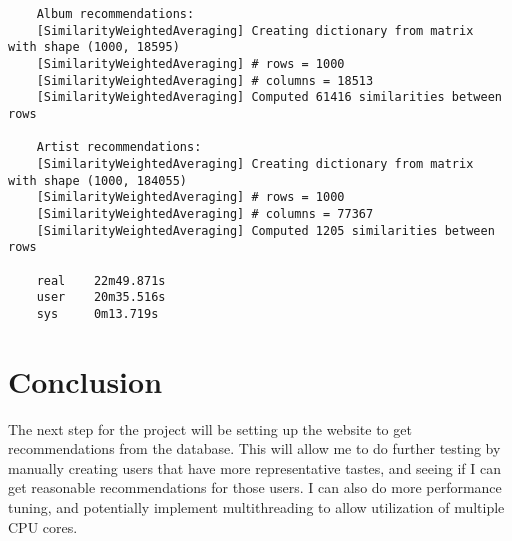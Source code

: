 \documentclass[12pt]{article}
\begin{document}
	\newpage

	\begin{verbatim}
	Album recommendations:
	[SimilarityWeightedAveraging] Creating dictionary from matrix  with shape (1000, 18595)
	[SimilarityWeightedAveraging] # rows = 1000
	[SimilarityWeightedAveraging] # columns = 18513
	[SimilarityWeightedAveraging] Computed 61416 similarities between rows

	Artist recommendations:
	[SimilarityWeightedAveraging] Creating dictionary from matrix  with shape (1000, 184055)
	[SimilarityWeightedAveraging] # rows = 1000
	[SimilarityWeightedAveraging] # columns = 77367
	[SimilarityWeightedAveraging] Computed 1205 similarities between rows

	real    22m49.871s
	user    20m35.516s
	sys     0m13.719s
	\end{verbatim}

	\section*{Conclusion}
	The next step for the project will be setting up the website to get recommendations from the database. This will allow me to do further testing by manually creating users that have more representative tastes, and seeing if I can get reasonable recommendations for those users. I can also do more performance tuning, and potentially implement multithreading to allow utilization of multiple CPU cores.
\end{document}
